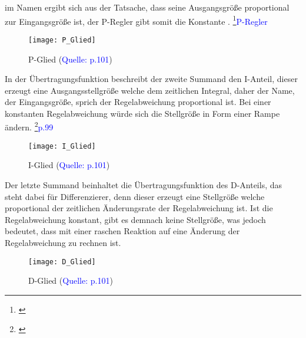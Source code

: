 \documentclass[titlepage,12pt,twoside]{article}
\begin{document}
 im Namen ergibt sich aus der Tatsache, dass seine Ausgangsgröße 
proportional zur Eingangsgröße ist, der P-Regler gibt somit die 
Konstante . \footnote{\cite{Q9}}\textcolor{blue}{P-Regler} \\
\begin{figure}[H]
	\begin{center}
		\scalebox{1.2}
		{\texttt{[image: P\_Glied]}}
		\caption{P-Glied (\textcolor{blue}{Quelle: \cite{Haager}p.101})}
		\label{fig:P_Glied}
	\end{center}
\end{figure}
\hfill \break
In der Übertragungsfunktion beschreibt der zweite Summand den I-Anteil, 
dieser erzeugt eine Ausgangsstellgröße welche dem zeitlichen Integral, 
daher der Name, der Eingangsgröße, sprich der Regelabweichung 
proportional ist. Bei einer konstanten Regelabweichung würde sich die 
Stellgröße in Form einer Rampe ändern. \footnote{\cite{Haager}}\textcolor{blue}{p.99} \\
\begin{figure}[H]
	\begin{center}
		\scalebox{1.2}
		{\texttt{[image: I\_Glied]}}
		\caption{I-Glied (\textcolor{blue}{Quelle: \cite{Haager}p.101})}
		\label{fig:I_Glied}
	\end{center}
\end{figure}
\hfill \break
Der letzte Summand beinhaltet die Übertragungsfunktion des D-Anteils, 
das  steht dabei für Differenzierer, denn dieser erzeugt eine 
Stellgröße welche proportional der zeitlichen Änderungsrate der 
Regelabweichung ist. Ist die Regelabweichung konstant, gibt es demnach 
keine Stellgröße, was jedoch bedeutet, dass mit einer raschen Reaktion 
auf eine Änderung der Regelabweichung zu rechnen ist. \\
\begin{figure}[H]
	\begin{center}
		\scalebox{1.2}
		{\texttt{[image: D\_Glied]}}
		\caption{D-Glied (\textcolor{blue}{Quelle: \cite{Haager}p.101})}
		\label{fig:D_Glied}
	\end{center}
\end{figure}
\hfill \break
\end{document}
